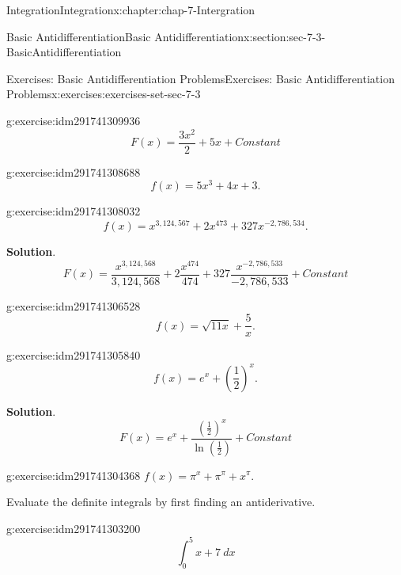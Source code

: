 \documentclass[oneside,10pt,]{book}
\numberwithin{equation}{section}
\begin{document}
\begin{chapterptx}{Integration}{}{Integration}{}{}{x:chapter:chap-7-Intergration}
\begin{sectionptx}{Basic Antidifferentiation}{}{Basic Antidifferentiation}{}{}{x:section:sec-7-3-BasicAntidifferentiation}
\begin{exercises-subsection}{Exercises: Basic Antidifferentiation Problems}{}{Exercises: Basic Antidifferentiation Problems}{}{}{x:exercises:exercises-set-sec-7-3}
\begin{divisionexercise}{1}{}{}{g:exercise:idm291741309936}
\begin{equation*}
F(x)=\frac{3x^2}{2}+5x+Constant
\end{equation*}
\end{divisionexercise}%
\begin{divisionexercise}{2}{}{}{g:exercise:idm291741308688}%
%
\begin{equation*}
f(x)=5x^3+4x+3.
\end{equation*}
\end{divisionexercise}%
\begin{divisionexercise}{3}{}{}{g:exercise:idm291741308032}%
%
\begin{equation*}
f(x)=x^{3,124,567}+2x^{473}+327 x^{-2,786,534}.
\end{equation*}
\par\smallskip%
\noindent\textbf{Solution}.\hypertarget{g:solution:idm291741307456}{}\quad{}%
\begin{equation*}
F(x)=\frac{x^{3,124,568}}{3,124,568}+2 \frac{x^{474}}{474}+327 \frac{x^{-2,786,533}}{-2,786,533}+Constant
\end{equation*}
\end{divisionexercise}%
\begin{divisionexercise}{4}{}{}{g:exercise:idm291741306528}%
%
\begin{equation*}
f(x)=\sqrt{11x}+\frac{5}{x}.
\end{equation*}
\end{divisionexercise}%
\begin{divisionexercise}{5}{}{}{g:exercise:idm291741305840}%
%
\begin{equation*}
f(x)=e^x+\left(\frac{1}{2}\right)^x.
\end{equation*}
\par\smallskip%
\noindent\textbf{Solution}.\hypertarget{g:solution:idm291741305280}{}\quad{}%
\begin{equation*}
F(x)=e^x+\frac{\left(\frac{1}{2}\right)^x}{\ln\left(\frac{1}{2}\right)}+Constant
\end{equation*}
\end{divisionexercise}%
\begin{divisionexercise}{6}{}{}{g:exercise:idm291741304368}%
\(f(x)=\pi^x+\pi^\pi+x^\pi.\)\end{divisionexercise}%
Evaluate the definite integrals by first finding an antiderivative.%
\begin{divisionexercise}{7}{}{}{g:exercise:idm291741303200}%
%
\begin{equation*}
\int_0^5 x+7\  dx
\end{equation*}

\end{divisionexercise}
\end{exercises-subsection}
\end{sectionptx}
\end{chapterptx}
\end{document}
